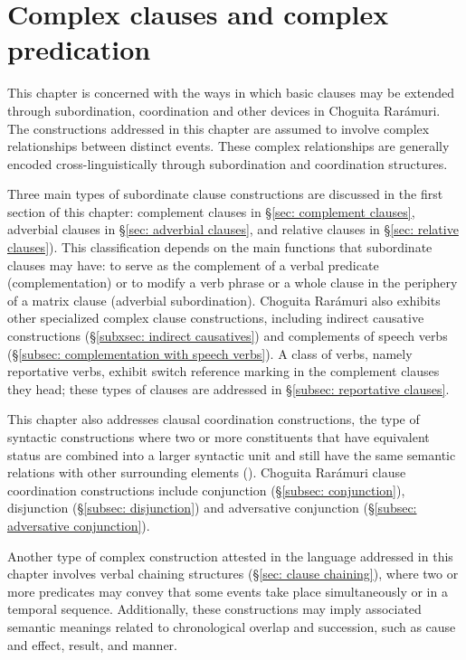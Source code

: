\chapter{Complex clauses and complex predication}
\label{chap: clause combining in complex sentences}


This chapter is concerned with the ways in which basic clauses may be extended through subordination, coordination and other devices in Choguita Rarámuri. The constructions addressed in this chapter are assumed to involve complex relationships between distinct events. These complex relationships are generally encoded cross-linguistically through subordination and coordination structures.

Three main types of subordinate clause constructions are discussed in the first section of this chapter: complement clauses in §\ref{sec: complement clauses}, adverbial clauses in §\ref{sec: adverbial clauses}, and relative clauses in §\ref{sec: relative clauses}). This classification depends on the main functions that subordinate clauses may have: to serve as the complement of a verbal predicate (complementation) or to modify a verb phrase or a whole clause in the periphery of a matrix clause (adverbial subordination). Choguita Rarámuri also exhibits other specialized complex clause constructions, including indirect causative constructions (§\ref{subxsec: indirect causatives}) and complements of speech verbs (§\ref{subsec: complementation with speech verbs}).  A class of verbs, namely reportative verbs, exhibit switch reference marking in the complement clauses they head; these types of clauses are addressed in §\ref{subsec: reportative clauses}.

This chapter also addresses clausal coordination constructions, the type of syntactic constructions where two or more constituents that have equivalent status are combined into a larger syntactic unit and still have the same semantic relations with other surrounding elements (\citealt{haspelmath2007coordination}). Choguita Rarámuri clause coordination constructions include conjunction (§\ref{subsec: conjunction}), disjunction (§\ref{subsec: disjunction}) and adversative conjunction (§\ref{subsec: adversative conjunction}).

Another type of complex construction attested in the language addressed in this chapter involves verbal chaining structures (§\ref{sec: clause chaining}), where two or more predicates may convey that some events take place simultaneously or in a temporal sequence. Additionally, these constructions may imply associated semantic meanings related to chronological overlap and succession, such as cause and effect, result, and manner.

